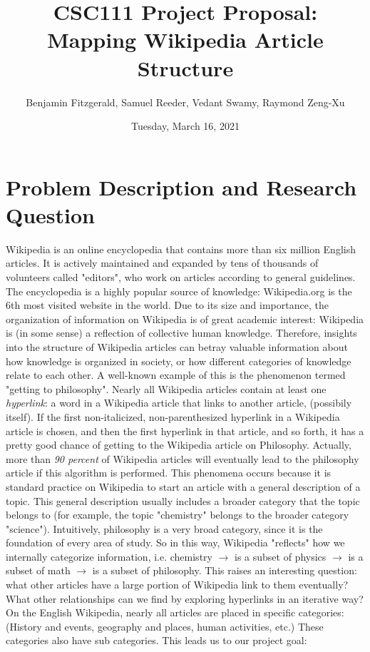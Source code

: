 \documentclass[fontsize=11pt]{article}
\title{CSC111 Project Proposal: Mapping Wikipedia Article Structure}
\author{Benjamin Fitzgerald, Samuel Reeder, Vedant Swamy, Raymond Zeng-Xu}
\date{Tuesday, March 16, 2021}
\begin{document}
\maketitle

\section*{Problem Description and Research Question}

Wikipedia is an online encyclopedia that contains more than six million English articles. It is actively maintained and expanded by tens of thousands of volunteers called "editors", who work on articles according to general guidelines. The encyclopedia is a highly popular source of knowledge: Wikipedia.org is the 6th most visited website in the world. Due to its size and importance, the organization of information on Wikipedia is of great academic interest: Wikipedia is (in some sense) a reflection of collective human knowledge. Therefore, insights into the structure of Wikipedia articles can betray valuable information about how knowledge is organized in society, or how different categories of knowledge relate to each other. A well-known example of this is the phenomenon termed "getting to philosophy". Nearly all Wikipedia articles contain at least one \textit{hyperlink}: a word in a Wikipedia article that links to another article, (possibily itself). If the first non-italicized, non-parenthesized hyperlink in a Wikipedia article is chosen, and then the first hyperlink in that article, and so forth, it has a pretty good chance of getting to the Wikipedia article on Philosophy. Actually, more than \textit{90 percent} of Wikipedia articles will eventually lead to the philosophy article if this algorithm is performed. This phenomena occurs because it is standard practice on Wikipedia to start an article with a general description of a topic. This general description usually includes a broader category that the topic belongs to (for example, the topic "chemistry" belongs to the broader category "science"). Intuitively, philosophy is a very broad category, since it is the foundation of every area of study. So in this way, Wikipedia "reflects" how we internally categorize information, i.e. chemistry $\rightarrow$ is a subset of physics $\rightarrow$ is a subset of math $\rightarrow$ is a subset of philosophy. This raises an interesting question: what other articles have a large portion of Wikipedia link to them eventually? What other relationships can we find by exploring hyperlinks in an iterative way? On the English Wikipedia, nearly all articles are placed in specific categories: (History and events, geography and places, human activities, etc.) These categories also have sub categories. This leads us to our project goal: 
\end{document}
